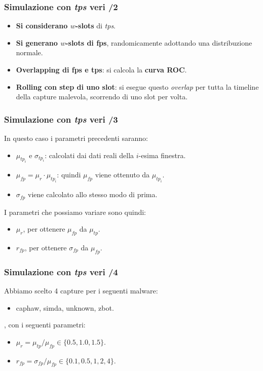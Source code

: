 \documentclass{beamer}
\begin{document}
\begin{frame}
    \frametitle{Simulazione con \textit{tps} veri /2}
    \begin{itemize}
        \item \textbf{Si considerano $w$-slots} di \textit{tps}.
        \item \textbf{Si generano $w$-slots di fps}, randomicamente adottando una distribuzione normale.
        \item \textbf{Overlapping di fps e tps}: si calcola la \textbf{curva ROC}.
        \item \textbf{Rolling con step di uno slot}: si esegue questo \textit{overlap} per tutta la timeline della capture
        malevola, scorrendo di uno slot per volta.
    \end{itemize}
\end{frame}



\begin{frame}
    \frametitle{Simulazione con \textit{tps} veri /3}
    In questo caso i parametri precedenti saranno:
    \begin{itemize}
        \item $\mu_{tp_{i}}$ e $\sigma_{tp_{i}}$: calcolati dai dati reali della
        $i$-esima finestra.
        \item $\mu_{fp}=\mu_r \cdot \mu_{tp_{i}}$: quindi $\mu_{fp}$ viene
        ottenuto da $\mu_{tp_{i}}$.
        \item $\sigma_{fp}$ viene calcolato allo stesso modo di prima.
    \end{itemize}
    I parametri che possiamo variare sono quindi:
    \begin{itemize}
        \item $\mu_r$, per ottenere $\mu_{fp}$ da $\mu_{tp}$.
        \item $r_{fp}$, per ottenere $\sigma_{fp}$ da $\mu_{fp}$.
    \end{itemize}
\end{frame}



\begin{frame}
    \frametitle{Simulazione con \textit{tps} veri /4}
    Abbiamo scelto 4 capture per i seguenti malware:
    \begin{itemize}
        \item caphaw, simda, unknown, zbot.
    \end{itemize}
    , con i seguenti parametri:
    \begin{itemize}
        \item $\mu_{r} = \mu_{tp}/\mu_{fp} \in \{ 0.5, 1.0, 1.5\}$.
        \item $r_{fp} = \sigma_{fp}/\mu_{fp} \in \{ 0.1, 0.5, 1, 2, 4 \}$.
    \end{itemize}
\end{frame}
\end{document}
